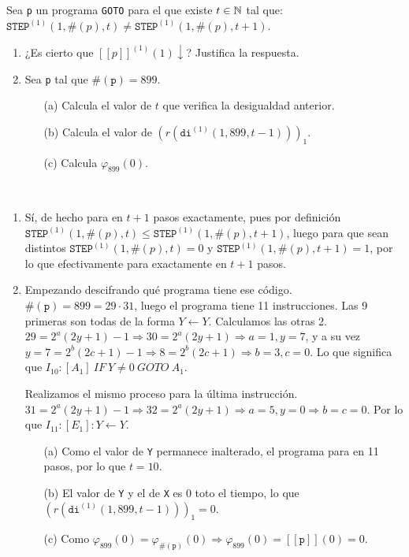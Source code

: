 \documentclass[twoside]{article}
\begin{document}
\begin{ejercicio}{18}
Sea \texttt{p} un programa \texttt{GOTO} para el que existe $t \in \mathbb{N}$ tal que:
$\texttt{STEP}^{(1)}(1, \#(p), t) \neq \texttt{STEP}^{(1)}(1, \#(p), t + 1)$.
\begin{enumerate}
\item ¿Es cierto que $[\![p]\!]^{(1)}(1) \downarrow$? Justifica la respuesta.
\item Sea \texttt{p} tal que $\#(\texttt{p}) = 899$.
\begin{itemize}
\item[(a)] Calcula el valor de $t$ que verifica la desigualdad anterior.
\item[(b)] Calcula el valor de $(r(\texttt{di}^{(1)}(1, 899, t - 1)))_1$.
\item[(c)] Calcula $\varphi_{899}(0)$.
\end{itemize}
\end{enumerate}
\end{ejercicio}
\begin{solucion}\
\begin{enumerate}
\item Sí, de hecho para en $t+1$ pasos exactamente, pues por definición $\texttt{STEP}^{(1)}(1, \#(p), t) \leq \texttt{STEP}^{(1)}(1, \#(p), t + 1)$, luego para que sean distintos $\texttt{STEP}^{(1)}(1, \#(p), t)=0$ y $\texttt{STEP}^{(1)}(1, \#(p), t + 1)=1$, por lo que efectivamente para exactamente en $t+1$ pasos. 
\item Empezando descifrando qué programa tiene ese código. $\#(\texttt{p})=899=29\cdot 31$, luego el programa tiene 11 instrucciones. Las 9 primeras son todas de la forma $Y\leftarrow Y$. Calculamos las otras 2. $29=2^a(2y+1)-1\Rightarrow 30=2^a(2y+1)\Rightarrow a=1, y=7$, y a su vez $y=7=2^b(2c+1)-1\Rightarrow 8=2^b(2c+1)\Rightarrow b=3, c=0$. Lo que significa que $I_{10}: [A_1]\ IF\ Y\neq 0\ GOTO\ A_1$.

Realizamos el mismo proceso para la última instrucción. $31=2^a(2y+1)-1\Rightarrow 32=2^a(2y+1)\Rightarrow a=5, y=0\Rightarrow b=c=0$. Por lo que $I_{11}: [E_1]: Y\leftarrow Y$. 
\begin{itemize}
\item[(a)] Como el valor de \texttt{Y} permanece inalterado, el programa para en 11 pasos, por lo que $t=10$.
\item[(b)] El valor de \texttt{Y} y el de \texttt{X} es 0 toto el tiempo, lo que $(r(\texttt{di}^{(1)}(1, 899, t - 1)))_1=0$.
\item[(c)] Como $\varphi_{899}(0)=\varphi_{\#(\texttt{p})}(0)\Rightarrow\varphi_{899}(0)=[\![\texttt{p}]\!](0)=0$.
\end{itemize}
\end{enumerate}
\end{solucion}
\end{document}

